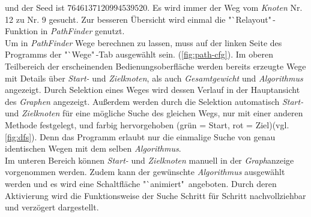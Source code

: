 \documentclass[12pt]{article}
\begin{document}
und der Seed ist $7646137120994539520$. Es wird immer der Weg vom \textit{Knoten} Nr. 12 zu Nr. 9 gesucht. Zur besseren Übersicht wird einmal die "`Relayout"\,-Funktion in \textit{PathFinder} genutzt. 
\\
Um in \textit{PathFinder} Wege berechnen zu lassen, muss auf der linken Seite des Programms der "`Wege"\,-Tab ausgewählt sein. (\autoref{fig:path-cfg}). Im oberen Teilbereich der erscheinenden Bedienungsoberfläche werden bereits erzeugte Wege mit Details über \textit{Start-} und \textit{Zielknoten}, als auch \textit{Gesamtgewicht} und \textit{Algorithmus} angezeigt. Durch Selektion eines Weges wird dessen Verlauf in der Hauptansicht des \textit{Graphen} angezeigt. Außerdem werden durch die Selektion automatisch \textit{Start-} und \textit{Zielknoten} für eine mögliche Suche des gleichen Wegs, nur mit einer anderen Methode festgelegt, und farbig hervorgehoben (grün = Start, rot = Ziel)(vgl. \autoref{fig:dfs}). Denn das Programm erlaubt nur die einmalige Suche von genau identischen Wegen mit dem selben \textit{Algorithmus}.
\\
Im unteren Bereich können \textit{Start-} und \textit{Zielknoten} manuell in der \textit{Graph}anzeige vorgenommen werden. Zudem kann der gewünschte \textit{Algorithmus} ausgewählt werden und es wird eine Schaltfläche "`animiert"\ angeboten. Durch deren Aktivierung wird die Funktionsweise der Suche Schritt für Schritt nachvollziehbar und verzögert dargestellt.
\end{document}
